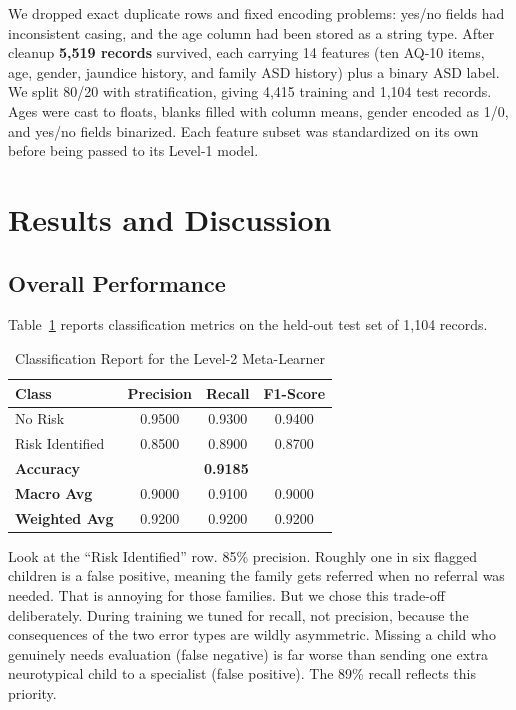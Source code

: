 \documentclass[conference]{IEEEtran}
\begin{document}
We dropped exact duplicate rows and fixed encoding problems: yes/no fields had inconsistent casing, and the age column had been stored as a string type. After cleanup \textbf{5,519 records} survived, each carrying 14 features (ten AQ-10 items, age, gender, jaundice history, and family ASD history) plus a binary ASD label. We split 80/20 with stratification, giving 4,415 training and 1,104 test records. Ages were cast to floats, blanks filled with column means, gender encoded as 1/0, and yes/no fields binarized. Each feature subset was standardized on its own before being passed to its Level-1 model.

\section{Results and Discussion}

\subsection{Overall Performance}
Table~\ref{tab:global_results} reports classification metrics on the held-out test set of 1,104 records.

\begin{table}[htbp]
\caption{Classification Report for the Level-2 Meta-Learner}
\label{tab:global_results}
\centering
\renewcommand{\arraystretch}{1.2}
\begin{tabular}{@{}lccc@{}}
\toprule
\textbf{Class} & \textbf{Precision} & \textbf{Recall} & \textbf{F1-Score} \\
\midrule
No Risk        & 0.9500 & 0.9300 & 0.9400 \\
Risk Identified & 0.8500 & 0.8900 & 0.8700 \\
\midrule
\textbf{Accuracy}     & \multicolumn{3}{c}{\textbf{0.9185}} \\
\textbf{Macro Avg}    & 0.9000 & 0.9100 & 0.9000 \\
\textbf{Weighted Avg} & 0.9200 & 0.9200 & 0.9200 \\
\bottomrule
\end{tabular}
\end{table}

Look at the ``Risk Identified'' row. 85\% precision. Roughly one in six flagged children is a false positive, meaning the family gets referred when no referral was needed. That is annoying for those families. But we chose this trade-off deliberately. During training we tuned for recall, not precision, because the consequences of the two error types are wildly asymmetric. Missing a child who genuinely needs evaluation (false negative) is far worse than sending one extra neurotypical child to a specialist (false positive). The 89\% recall reflects this priority.
\end{document}
